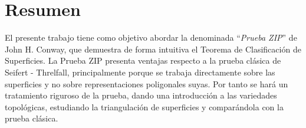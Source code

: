 \documentclass[10pt]{report}
\theoremstyle{definition}
\newcommand\blankpage{%
    \null
    \thispagestyle{empty}%
    \newpage}
\begin{document}
\afterpage{\blankpage}
\section*{Resumen}
El presente trabajo tiene como objetivo abordar la denominada ``\textit{Prueba ZIP}'' de John H. Conway, que demuestra de forma intuitiva el Teorema de Clasificación de Superficies. La Prueba ZIP presenta ventajas respecto a la prueba clásica de Seifert - Threlfall, principalmente porque se trabaja directamente sobre las superficies y no sobre representaciones poligonales suyas. Por tanto se hará un tratamiento riguroso de la prueba, dando una introducción a las variedades topológicas, estudiando la triangulación de superficies y comparándola con la prueba clásica.
\end{document}

